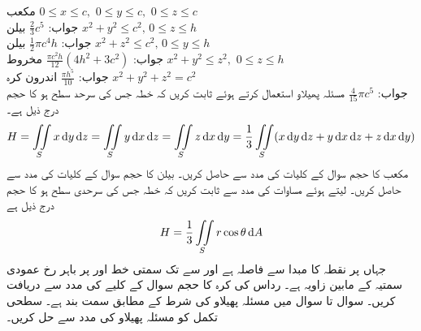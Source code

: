 \quad مکعب 
$0\le x\le c,\,\, 0 \le y \le c,\,\, 0\le z \le c\,\,$\\
جواب:\quad
$\tfrac{2}{3}c^5$
\quad بیلن 
$x^2+y^2 \le c^2,\, 0\le z \le h\,\,$\\
جواب:\quad
$\tfrac{1}{2}\pi c^4 h$
\quad بیلن 
$x^2+z^2 \le c^2,\, 0\le y \le h\,\,$\\
جواب:\quad
$\tfrac{\pi c^2h}{12}(4h^2+3c^2)$
\quad مخروط
$x^2+y^2\le z^2,\,\, 0\le z \le h\,\,$\\
جواب:\quad
$\tfrac{\pi h^5}{10}$
\quad اندرون کرہ
$x^2+y^2+z^2=c^2\,\,$\\
جواب:\quad
$\tfrac{4}{15}\pi c^5$
\quad مسئلہ پھیلاو استعمال کرتے ہوئے ثابت کریں کہ خطہ  جس کی سرحد سطح  ہو کا حجم  درج ذیل ہے۔
\begin{align*}
H=\iint\limits_S x\dif y\dif z=\iint\limits_S y\dif x \dif z=\iint\limits_S z\dif x\dif y=\frac{1}{3}\iint\limits_S (x\dif y\dif z+y\dif x\dif z+z\dif x\dif y)
\end{align*}
\quad مکعب کا حجم سوال  کے کلیات کی مدد سے حاصل کریں۔
\quad بیلن  کا حجم سوال  کے کلیات کی مدد سے حاصل کریں۔
\quad 
{} لیتے ہوئے مساوات  کی مدد سے ثابت کریں کہ خطہ  جس کی سرحدی سطح  ہو کا حجم درج ذیل ہے
\begin{align*}
H=\frac{1}{3}\iint\limits_S r\cos \theta \dif A
\end{align*}
جہاں  پر نقطہ  کا مبدا  سے فاصلہ  ہے اور  سے  تک سمتی خط  اور  پر باہر رخ  عمودی سمتیہ کے مابین زاویہ  ہے۔  
\quad رداس  کی کرہ کا حجم سوال  کے کلیے کی مدد سے دریافت کریں۔
سوال  تا سوال  میں  مسئلہ پھیلاو کی شرط کے مطابق سمت بند ہے۔ سطحی تکمل کو مسئلہ پھیلاو کی مدد سے حل کریں۔ 

